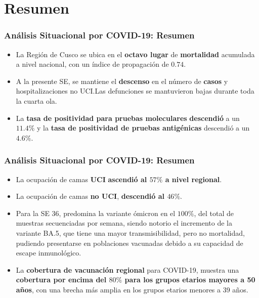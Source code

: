 \documentclass[xcolor=table]{beamer}
\begin{document}
\section{Resumen}
\begin{frame}[label=Resumen]
	\frametitle{Análisis Situacional por COVID-19: Resumen}
	\vspace{-.5cm}
	\begin{itemize}
		\item La Región de Cusco se ubica en el \textbf{\color{mycolor4}octavo lugar} de \textbf{\color{mycolor3}mortalidad} acumulada a nivel nacional, con un índice de propagación de $0.74 $.   
		\item A la presente SE, se mantiene el \textbf{\color{mycolor4} descenso} en el número de \textbf{\color{mycolor3}casos} y hospitalizaciones no UCI.Las defunciones se mantuvieron bajas durante toda la cuarta ola.
		\item La \textbf{\color{mycolor3}tasa de positividad para pruebas moleculares} \textbf{\color{mycolor4}descendió} a un $11.4\%$ y la \textbf{\color{mycolor3}tasa de positividad de pruebas antigénicas} descendió a un $4.6\%$.
	\end{itemize}
\end{frame}

\begin{frame}
	\frametitle{Análisis Situacional por COVID-19: Resumen}
	\vspace{-.5cm}
	\begin{itemize}
	\item La ocupación de camas \textbf{\color{mycolor3}UCI} \textbf{\color{mycolor3} ascendió al $57\%$ a nivel regional}.
	\item La ocupación de camas \textbf{\color{mycolor3}no UCI}, \textbf{\color{mycolor4}descendió al $46\%$}. 
	\item Para la SE 36, predomina la variante ómicron en el $100\%$, del total de muestras secuenciadas por semana, siendo notorio el incremento de la variante BA.5, que tiene una mayor transmisibilidad, pero no mortalidad, pudiendo presentarse en poblaciones vacunadas debido a su capacidad de escape inmunológico.
	\item La \textbf{\color{mycolor3}cobertura de vacunación regional} para COVID-19, muestra una \textbf{\color{mycolor4}cobertura por encima del $80\%$ para los grupos etarios mayores a 50 años}, con una brecha más amplia en los grupos etarios menores a 39 años.	
	\end{itemize}
\end{frame}
\end{document}
